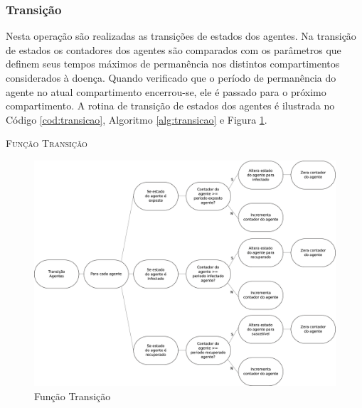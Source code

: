 \newpage

\subsubsection{Transição}

Nesta operação são realizadas as transições de estados dos agentes. Na transição de estados os contadores dos agentes são comparados com os parâmetros que definem seus tempos máximos de permanência nos distintos compartimentos considerados à doença. Quando verificado que o período de permanência do agente no atual compartimento encerrou-se, ele é passado para o próximo compartimento. A rotina de transição de estados dos agentes é ilustrada no Código \ref{cod:transicao}, Algoritmo \ref{alg:transicao} e Figura \ref{fig:transicao}. 



\begin{algorithm}[H]
 \SetAlgoLined  
 
 \caption{\textsc{Função Transição}} 
 \label{alg:transicao}
\end{algorithm}

\begin{figure}[H]
  \centering
  \includegraphics[width=1\textwidth]{Figuras/EstruturasDadosEstrategias/Operadores/Transicao.eps}
  \caption{Função Transição}
  \label{fig:transicao}
\end{figure} 

\newpage

